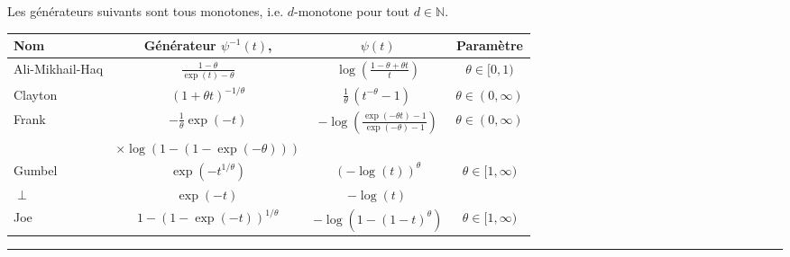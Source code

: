 \begin{f}[Copule]
Les générateurs suivants sont tous monotones, i.e. $d$-monotone pour tout $d\in\mathbb{N}$.

\footnotesize
\renewcommand\arraystretch{1.3}
\begin{tabular}{|m{10mm}|ccc|}	\rowcolor{BleuProfondIRA!40} 
	\hline
 Nom 		& Générateur $\psi^{-1}(t)$, 	& $\psi(t)$ &	Paramètre\\
	\hline
	Ali-Mikhail-Haq 	&$\frac{1-\theta}{\exp(t)-\theta} $	
	&$\log\left(\frac{1-\theta+\theta t}{t}\right)$ 	
	&$\theta\in[0,1)$\\
	Clayton		&$\left(1+\theta t\right)^{-1/\theta} 	$
	&$\frac1\theta\,(t^{-\theta}-1)\, 	$
	&$\theta\in(0,\infty)$\\
	Frank 		&$-\frac{1}{\theta}\exp(-t)$
	&$-\log\left(\frac{\exp(-\theta t)-1}{\exp(-\theta)-1}\right)$
	&$\theta\in(0,\infty)$\\
	&$\times\log(1-(1-\exp(-\theta)))$
	&
	&\\
	Gumbel 		&$\exp\left(-t^{1/\theta}\right) $	
	&$\left(-\log(t)\right)^\theta$	
	&$\theta\in[1,\infty)$\\
	$\perp$ 	&$\exp(-t)\,$
	&$-\log(t)\,$ 	
	& \\
	Joe		&$1-\left(1-\exp(-t)\right)^{1/\theta}$
	&$-\log\left(1-(1-t)^\theta\right)$
	&$\theta\in[1,\infty)$\\
	\hline
\end{tabular}
\renewcommand\arraystretch{1}
\end{f}
\hrule

